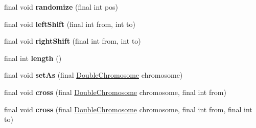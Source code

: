 \begin{CompactItemize}
\item 
\hypertarget{classjenes_1_1chromosome_1_1_double_chromosome_370f8d51fa8635eeadf925e2faf11991}{
final void \textbf{randomize} (final int pos)}
\label{classjenes_1_1chromosome_1_1_double_chromosome_370f8d51fa8635eeadf925e2faf11991}

\item 
\hypertarget{classjenes_1_1chromosome_1_1_double_chromosome_8d8eb8ce2b20abad8d462ae87a213e85}{
final void \textbf{leftShift} (final int from, int to)}
\label{classjenes_1_1chromosome_1_1_double_chromosome_8d8eb8ce2b20abad8d462ae87a213e85}

\item 
\hypertarget{classjenes_1_1chromosome_1_1_double_chromosome_e2c6d9bac13241a8338623c612d0f70b}{
final void \textbf{rightShift} (final int from, int to)}
\label{classjenes_1_1chromosome_1_1_double_chromosome_e2c6d9bac13241a8338623c612d0f70b}

\item 
\hypertarget{classjenes_1_1chromosome_1_1_double_chromosome_0938c891dcd64d56dcbfbc9136438b92}{
final int \textbf{length} ()}
\label{classjenes_1_1chromosome_1_1_double_chromosome_0938c891dcd64d56dcbfbc9136438b92}

\item 
\hypertarget{classjenes_1_1chromosome_1_1_double_chromosome_7479d1ee74934b04f478dcf8fad35464}{
final void \textbf{setAs} (final \hyperlink{classjenes_1_1chromosome_1_1_double_chromosome}{DoubleChromosome} chromosome)}
\label{classjenes_1_1chromosome_1_1_double_chromosome_7479d1ee74934b04f478dcf8fad35464}

\item 
\hypertarget{classjenes_1_1chromosome_1_1_double_chromosome_0461bfc35a8ca0c503ba0a4017005f89}{
final void \textbf{cross} (final \hyperlink{classjenes_1_1chromosome_1_1_double_chromosome}{DoubleChromosome} chromosome, final int from)}
\label{classjenes_1_1chromosome_1_1_double_chromosome_0461bfc35a8ca0c503ba0a4017005f89}

\item 
\hypertarget{classjenes_1_1chromosome_1_1_double_chromosome_caad58427cf1db8071fe2032755bbdce}{
final void \textbf{cross} (final \hyperlink{classjenes_1_1chromosome_1_1_double_chromosome}{DoubleChromosome} chromosome, final int from, final int to)}
\label{classjenes_1_1chromosome_1_1_double_chromosome_caad58427cf1db8071fe2032755bbdce}


\end{CompactItemize}

